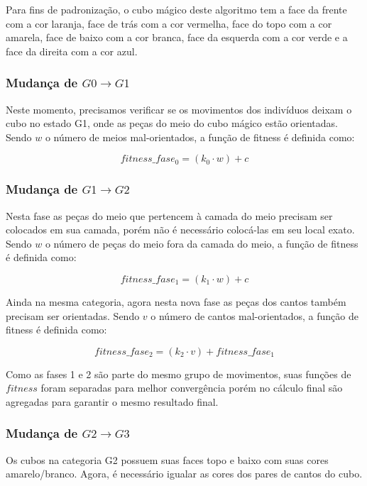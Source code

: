 \documentclass[12pt]{article}
\begin{document}
    Para fins de padronização, o cubo mágico deste algoritmo tem a face da frente com a cor laranja, face  de trás com a cor vermelha, face do topo com a cor amarela, face de baixo com a cor branca, face da esquerda com a cor verde e a face da direita com a cor azul.

    \subsubsection{Mudança de $G0 \to G1$}
      Neste momento, precisamos verificar se os movimentos dos indivíduos deixam o cubo no estado G1, onde as peças do meio do cubo mágico estão orientadas. Sendo $w$ o número de meios mal-orientados, a função de fitness é definida como:

      \begin{equation}
      fitness\_fase_0 = (k_0 \cdot w) + c
      \end{equation}

    \subsubsection{Mudança de $G1 \to G2$}
      Nesta fase as peças do meio que pertencem à camada do meio precisam ser colocados em sua camada, porém não é necessário colocá-las em seu local exato. Sendo $w$ o número de peças do meio fora da camada do meio, a função de fitness é definida como:
      
      \begin{equation}
      fitness\_fase_1 = (k_1 \cdot w) + c
      \end{equation}

      Ainda na mesma categoria, agora nesta nova fase as peças dos cantos também precisam ser orientadas. Sendo $v$ o número de cantos mal-orientados, a função de fitness é definida como:

      \begin{equation}
      fitness\_fase_2 = (k_2 \cdot v) + fitness\_fase_1
      \end{equation}

      Como as fases 1 e 2 são parte do mesmo grupo de movimentos, suas funções de $fitness$ foram separadas para melhor convergência porém no cálculo final são agregadas para garantir o mesmo resultado final.

    \subsubsection{Mudança de $G2 \to G3$}
      Os cubos na categoria G2 possuem suas faces topo e baixo com suas cores amarelo/branco. Agora, é necessário igualar as cores dos pares de cantos do cubo.
\end{document}
